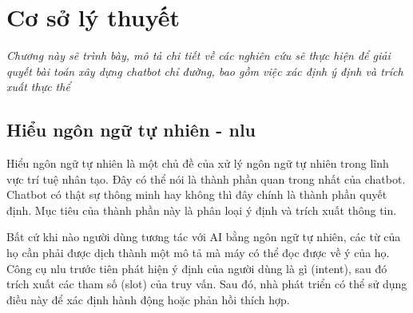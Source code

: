 \chapter{Cơ sở lý thuyết}
\label{Chapter3}

\emph{Chương này sẽ trình bày, mô tả chi tiết về các nghiên cứu sẽ thực hiện để giải quyết bài toán xây dựng chatbot chỉ đường, bao gồm việc xác định ý định và trích xuất thực thể}

\section{Hiểu ngôn ngữ tự nhiên - \ac{nlu}}

Hiểu ngôn ngữ tự nhiên là một chủ đề của xử lý ngôn ngữ tự nhiên trong lĩnh vực trí tuệ nhân tạo. Đây có thể nói là thành phần quan trong nhất của chatbot. Chatbot có thật sự thông minh hay không thì đây chính là thành phần quyết định. Mục tiêu của thành phần này là phân loại ý định và trích xuất thông tin.

Bất cứ khi nào người dùng tương tác với AI bằng ngôn ngữ tự nhiên, các từ của họ cần phải được dịch thành một mô tả mà máy có thể đọc được về ý của họ.
Công cụ \ac{nlu} trước tiên phát hiện ý định của người dùng là gì (intent), sau đó trích xuất các tham số (slot) của truy vấn. Sau đó, nhà phát triển có thể sử dụng điều này để xác định hành động hoặc phản hồi thích hợp.

